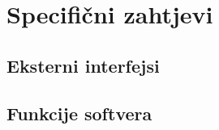 \chapter{Specifični zahtjevi}
\label{poglavlje3}
\section{Eksterni interfejsi}

\section{Funkcije softvera}
